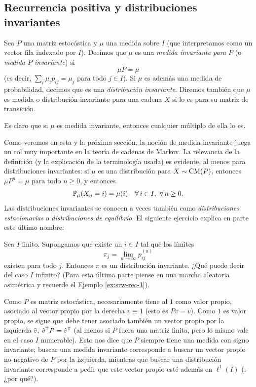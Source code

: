 \subsection{Recurrencia positiva y distribuciones invariantes}

\begin{defn}
Sea $P$ una matriz estocástica y $\mu$ una medida sobre $I$ (que interpretamos como un vector fila indexado por $I$).
Decimos que $\mu$ es una \emph{medida invariante para $P$} (o \emph{medida $P$-invariante}) si
\[\mu P=\mu\]
(es decir, $\sum_i\mu_{i}p_{ij}=\mu_j$ para todo $j\in I$).
Si $\mu$ es además una medida de probabilidad, decimos que es una \emph{distribución invariante}.
Diremos también que $\mu$ es medida o distribución invariante para una cadena $X$ si lo es para su matriz de transición.
\end{defn}

Es claro que si $\mu$ es medida invariante, entonces cualquier múltiplo de ella lo es.

Como veremos en esta y la próxima sección, la noción de medida invariante juega un rol muy importante en la teoría de cadenas de Markov.
La relevancia de la definición (y la explicación de la terminología usada) es evidente, al menos para distribuciones invariantes: si $\mu$ es una distribución para $X\sim\text{\upshape{CM}}(P)$, entonces $\mu P^n=\mu$ para todo $n\geq0$, y entonces
\[\mathbb{P}_\mu(X_n=i)=\mu(i)\quad\forall\,i\in I,~\forall\,n\geq0.\]
Las distribuciones invariantes se conocen a veces también como \emph{distribuciones estacionarias} o \emph{distribuciones de equilibrio}.
El siguiente ejercicio explica en parte este último nombre:

\begin{exer}
Sea $I$ finito.
Supongamos que existe un $i\in I$ tal que los límites
\[\pi_j=\lim_{n\to\infty}p^{(n)}_{ij}\]
existen para todo $j$.
Entonces $\pi$ es un distribución invariante.
¿Qué puede decir del caso $I$ infinito? 
(Para esta última parte piense en una marcha aleatoria asimétrica y recuerde el Ejemplo \ref{ex:srw-rec-1}).
\end{exer}

\begin{rem}
Como $P$ es matriz estocástica, necesariamente tiene al $1$ como valor propio, asociado al vector propio por la derecha $v\equiv1$ (esto es $Pv=v$).
Como $1$ es valor propio, se sigue que debe tener asociado también un vector propio por la izquierda $\hat v$, $\hat v^{\sf T}P=\hat v^{\sf T}$ (al menos si $P$ fuera una matriz finita, pero lo mismo vale en el caso $I$ numerable).
Esto nos dice que $P$ siempre tiene una medida con signo invariante; buscar una medida invariante corresponde a buscar un vector propio no-negativo de $P$ por la izquierda, mientras que buscar una distribución invariante corresponde a pedir que este vector propio esté además en $\ell^1(I)$ (\uexers: ¿por qué?).
\end{rem}

